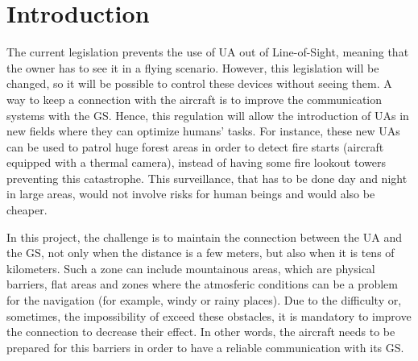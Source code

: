 \chapter{Introduction}\label{ch:intro}

The current legislation prevents the use of UA out of Line-of-Sight, meaning that the owner has to see it in a flying scenario. However, this legislation will be changed, so it will be possible to control these devices without seeing them. A way to keep a connection with the aircraft is to improve the communication systems with the GS. Hence, this regulation will allow the introduction of UAs in new fields where they can optimize humans' tasks. For instance, these new UAs can be used to patrol huge forest areas in order to detect fire starts (aircraft equipped with a thermal camera), instead of having some fire lookout towers preventing this catastrophe. This surveillance, that has to be done day and night in large areas, would not involve risks for human beings and would also be cheaper. 




In this project, the challenge is to maintain the connection between the UA and the GS, not only when the distance is a few meters, but also when it is tens of kilometers. Such a zone can include mountainous areas, which are physical barriers, flat areas and zones where the atmosferic conditions can be a problem for the navigation (for example, windy or rainy places). Due to the difficulty or, sometimes, the impossibility of exceed these obstacles, it is mandatory to improve the connection to decrease their effect. In other words, the aircraft needs to be prepared for this barriers in order to have a reliable communication with its GS. 

